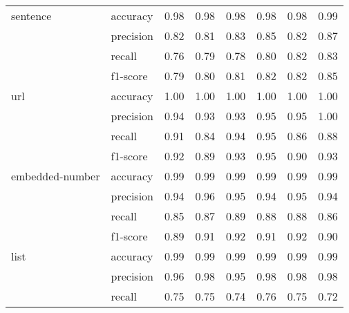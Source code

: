 \begin{tabular}{llrrrrrr}
sentence & accuracy &             0.98 &             0.98 &             0.98 &             0.98 &             0.98 &              0.99 \\
                 & precision &             0.82 &             0.81 &             0.83 &             0.85 &             0.82 &              0.87 \\
                 & recall &             0.76 &             0.79 &             0.78 &             0.80 &             0.82 &              0.83 \\
                 & f1-score &             0.79 &             0.80 &             0.81 &             0.82 &             0.82 &              0.85 \\
url & accuracy &             1.00 &             1.00 &             1.00 &             1.00 &             1.00 &              1.00 \\
                 & precision &             0.94 &             0.93 &             0.93 &             0.95 &             0.95 &              1.00 \\
                 & recall &             0.91 &             0.84 &             0.94 &             0.95 &             0.86 &              0.88 \\
                 & f1-score &             0.92 &             0.89 &             0.93 &             0.95 &             0.90 &              0.93 \\
embedded-number & accuracy &             0.99 &             0.99 &             0.99 &             0.99 &             0.99 &              0.99 \\
                 & precision &             0.94 &             0.96 &             0.95 &             0.94 &             0.95 &              0.94 \\
                 & recall &             0.85 &             0.87 &             0.89 &             0.88 &             0.88 &              0.86 \\
                 & f1-score &             0.89 &             0.91 &             0.92 &             0.91 &             0.92 &              0.90 \\
list & accuracy &             0.99 &             0.99 &             0.99 &             0.99 &             0.99 &              0.99 \\
                 & precision &             0.96 &             0.98 &             0.95 &             0.98 &             0.98 &              0.98 \\
                 & recall &             0.75 &             0.75 &             0.74 &             0.76 &             0.75 &              0.72 \\

\end{tabular}

